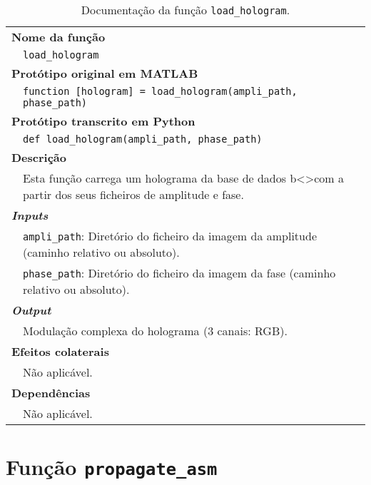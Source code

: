 \begin{table}[!hp]
    \centering
    \caption{Documentação da função \texttt{load\_hologram}.}
    \label{tab:load_hologram}
    \begin{tabular}{p{1cm} p{11.5cm}}
        \hline
        \multicolumn{2}{l}{\bfseries\small Nome da função}\\
         & \verb|load_hologram|\\
        \hline
        \multicolumn{2}{l}{\bfseries\small Protótipo original em MATLAB}\\
         & \texttt{function [hologram] = load_hologram(ampli_path, phase_path)}\\
        \hline
        \multicolumn{2}{l}{\bfseries\small Protótipo transcrito em Python}\\
         & \texttt{def load_hologram(ampli_path, phase_path)} \\
        \hline\multicolumn{2}{l}{\bfseries\small Descrição}\\
         & Esta função carrega um holograma da base de dados b<>com a partir dos seus ficheiros de amplitude e fase.\\
        \hline\multicolumn{2}{l}{\bfseries\small \textit{Inputs}}\\
         & \verb|ampli_path|: Diretório do ficheiro da imagem da amplitude (caminho relativo ou absoluto).\\
         & \verb|phase_path|: Diretório do ficheiro da imagem da fase (caminho relativo ou absoluto).\\
        \hline\multicolumn{2}{l}{\bfseries\small \textit{Output}}\\
         & Modulação complexa do holograma (3 canais: \ac{RGB}).\\
        \hline\multicolumn{2}{l}{\bfseries\small Efeitos colaterais}\\
         & Não aplicável. \\
        \hline\multicolumn{2}{l}{\bfseries\small Dependências}\\
         & Não aplicável. \\
        \hline
    \end{tabular}
\end{table}


\newpage
\section{Função \texttt{propagate\_asm}}
\label{sec::doc-codigo:propagate_asm}

